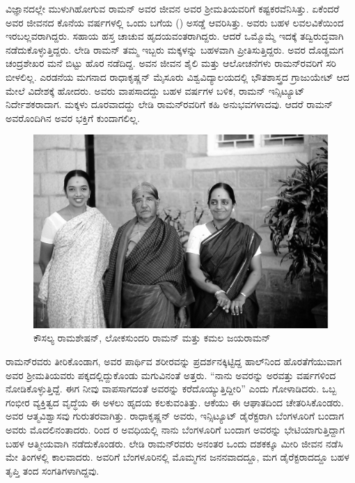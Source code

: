ವಿಜ್ಞಾನದಲ್ಲೇ ಮುಳುಗಿಹೋಗುವ ರಾಮನ್ ಅವರ ಜೀವನ ಅವರ ಶ‍್ರೀಮತಿಯವರಿಗೆ ಕಷ್ಟಕರವೆನಿಸಿತ್ತು. ಏಕೆಂದರೆ ಅವರ ಜೀವನದ ಕೊನೆಯ ವರ್ಷಗಳಲ್ಲಿ ಒಂದು ಬಗೆಯ () ಅಸಡ್ಡೆ ಆವರಿಸಿತ್ತು. ಅವರು ಬಹಳ ಲವಲವಿಕೆಯಿಂದ ಇರಬಲ್ಲವರಾಗಿದ್ದರು. ಸಹಾಯ ಹಸ್ತ ಚಾಚುವ ಹೃದಯವಂತರಾಗಿದ್ದರು. ಆದರೆ ಒಮ್ಮೊಮ್ಮೆ ಇದಕ್ಕೆ ತದ್ವಿರುದ್ಧವಾಗಿ ನಡೆದುಕೊಳ್ಳುತ್ತಿದ್ದರು. ಲೇಡಿ ರಾಮನ್ ತಮ್ಮ ಇಬ್ಬರು ಮಕ್ಕಳನ್ನು ಬಹಳವಾಗಿ ಪ್ರೀತಿಸುತ್ತಿದ್ದರು. ಅವರ ದೊಡ್ಡಮಗ ಚಂದ್ರಶೇಖರ ಮನೆ ಬಿಟ್ಟು ಹೊರ ನಡೆದಿದ್ದ. ಅವನ ಜೀವನ ಶೈಲಿ ಮತ್ತು ಆಲೋಚನೆಗಳು ರಾಮನ್‍ರವರಿಗೆ ಸರಿ ಬೀಳಲಿಲ್ಲ. ಎರಡನೆಯ ಮಗನಾದ ರಾಧಾಕೃಷ್ಣನ್ ಮೈಸೂರು ವಿಶ್ವವಿದ್ಯಾಲಯ\-ದಲ್ಲಿ ಭೌತಶಾಸ್ತ್ರದ ಗ್ರಾಜುಯೇಟ್ ಆದ ಮೇಲೆ ವಿದೇಶಕ್ಕೆ ಹೋದರು. ಅವರು ವಾಪಸಾದದ್ದು ಬಹಳ ವರ್ಷಗಳ ಬಳಿಕ, ರಾಮನ್ ಇನ್ಸಿಟ್ಯೂಟ್ ನಿರ್ದೇಶಕರಾದಾಗ. ಮಕ್ಕಳು ದೂರವಾದದ್ದು ಲೇಡಿ ರಾಮನ್‍ರವರಿಗೆ ಕಹಿ ಅನುಭವಗಳಾದವು. ಆದರೆ ರಾಮನ್ ಅವರೊಂದಿಗಿನ ಅವರ ಭಕ್ತಿಗೆ ಕುಂದಾಗಲಿಲ್ಲ.

\begin{figure}[!htpb]
\centering
\includegraphics[scale=0.216]{"images/17.jpg"}
\caption{ಕೌಸಲ್ಯ ರಾಮಶೇಷನ್, ಲೋಕಸುಂದರಿ ರಾಮನ್ ಮತ್ತು ಕಮಲ ಜಯರಾಮನ್}\label{chap5-fig01}
\end{figure}

ರಾಮನ್‍ರವರು ತೀರಿಕೊಂಡಾಗ, ಅವರ ಪಾರ್ಥಿವ ಶರೀರವನ್ನು ಪ್ರದರ್ಶನಕ್ಕಿಟ್ಟಿದ್ದ ಹಾಲ್‍ನಿಂದ ಹೊರತೆಗೆಯುವಾಗ ಅವರ ಶ‍್ರೀಮತಿಯವರು ಪಕ್ಕದಲ್ಲಿದ್ದುಕೊಂಡು ಮಗುವಿನಂತೆ ಅತ್ತರು. “ನಾನು ಅವರನ್ನು ಅರವತ್ತು ವರ್ಷಗಳಿಂದ ನೋಡಿಕೊಳ್ಳುತ್ತಿದ್ದೆ. ಈಗ ನೀವು ವಾಪಸಾಗದಂತೆ ಅವರನ್ನು ಕರೆದೊಯ್ಯುತ್ತಿದ್ದೀರಿ” ಎಂದು ಗೋಳಾಡಿದರು. ಒಬ್ಬ ಗಂಭೀರ ವ್ಯಕ್ತಿತ್ವದ ವೃದ್ಧೆಯ ಈ ಅಳಲು ಹೃದಯ ಕಲಕುವಂತಿತ್ತು. ಆಕೆಯು ಈ ಆಘಾತದಿಂದ ಚೇತರಿಸಿಕೊಂಡರು. ಅವರ ಆತ್ಮವಿಶ್ವಾಸವು ಗುರುತರವಾಗಿತ್ತು. ರಾಧಾಕೃಷ್ಣನ್ ಅವರು, ಇನ್ಸಿಟ್ಯೂಟ್ ಡೈರೆಕ್ಟರಾಗಿ ಬೆಂಗಳೂರಿಗೆ ಬಂದಾಗ ಅವರು ಮೊದಲಿನಂತಾದರು.  ರಿಂದ ರ ಅವಧಿಯಲ್ಲಿ ನಾನು ಬೆಂಗಳೂರಿಗೆ ಬಂದಾಗ ಅವರನ್ನು ಭೇಟಿಯಾಗುತ್ತಿದ್ದಾಗ ಬಹಳ ಆತ್ಮೀಯವಾಗಿ ನಡೆದುಕೊಂಡರು. ಲೇಡಿ ರಾಮನ್‍ರವರು ಅನಂತರ ಒಂದು ದಶಕಕ್ಕೂ ಮೀರಿ ಜೀವನ ನಡೆಸಿ  ಮೇ ತಿಂಗಳಲ್ಲಿ ಕಾಲವಾದರು. ಅವರಿಗೆ ಬೆಂಗಳೂರಿನಲ್ಲಿ ಮೊಮ್ಮಗನ ಜನನವಾದದ್ದೂ, ಮಗ ಡೈರೆಕ್ಟರಾದದ್ದೂ ಬಹಳ ತೃಪ್ತಿ ತಂದ ಸಂಗತಿಗಳಾಗಿದ್ದವು.


